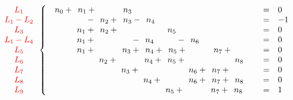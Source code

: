 \documentclass[10pt,a2paper]{article}
\begin{document}
\vspace{3em}
${\color{red}\begin{array}{c} L_1\\ L_1-L_2\\ L_3\\ L_1-L_4\\ L_5\\ L_6\\ L_7\\L_8\\L_9\end{array}    }
\left\{\begin{array}{l c l}\phantom{0}n_{0} +\phantom{0}n_{1} +\phantom{ 0n_{2} +\ } \phantom{0}n_{3} \phantom{+\ 0n_{4} +\ } \phantom{ 0n_{5} +\ } \phantom{ 0n_{6} +\ } \phantom{ 0n_{7} +\ } \phantom{ 0n_{8} +\ }&=& 0\\\phantom{0n_{0} +\ }\phantom{0n_{1} }-\phantom{0}n_{2} +\phantom{ 0}n_{3} - \phantom{0}n_{4} \phantom{+\ 0n_{5} +\ } \phantom{ 0n_{6} +\ } \phantom{ 0n_{7} +\ } \phantom{ 0n_{8} +\ }&=& -1\\\phantom{ 0n_{0} +\ } \phantom{0}n_{1} +\phantom{0}n_{2} +\phantom{ 0n_{3} +\ } \phantom{ 0n_{4} +\ } \phantom{0}n_{5} \phantom{+\ 0n_{6} +\ } \phantom{ 0n_{7} +\ } \phantom{ 0n_{8} +\ }&=& 0\\\phantom{0n_{0} +\ }\phantom{ 0}n_{1} +  \phantom{ 0n_{2} +\ } \phantom{0n_{3}  }- \phantom{0}n_{4} \phantom{+\ 0n_{5}  }- \phantom{0}n_{6} \phantom{+\ 0n_{7} +\ } \phantom{ 0n_{8} +\ }&=& 0\\\phantom{ 0n_{0} +\ } \phantom{0}n_{1} +\phantom{ 0n_{2} +\ } \phantom{0}n_{3} +\phantom{0}n_{4} +\phantom{0}n_{5} +\phantom{ 0n_{6} +\ } \phantom{0}n_{7} +\phantom{ 0n_{8} +\ }&=& 0\\\phantom{ 0n_{0} +\ } \phantom{ 0n_{1} +\ } \phantom{0}n_{2} +\phantom{ 0n_{3} +\ } \phantom{0}n_{4} +\phantom{0}n_{5} +\phantom{ 0n_{6} +\ } \phantom{ 0n_{7} +\ } \phantom{0}n_{8} &=& 0\\\phantom{ 0n_{0} +\ } \phantom{ 0n_{1} +\ } \phantom{ 0n_{2} +\ } \phantom{0}n_{3} +\phantom{ 0n_{4} +\ } \phantom{ 0n_{5} +\ } \phantom{0}n_{6} +\phantom{0}n_{7} +\phantom{ 0n_{8} +\ }&=& 0\\\phantom{ 0n_{0} +\ } \phantom{ 0n_{1} +\ } \phantom{ 0n_{2} +\ } \phantom{ 0n_{3} +\ } \phantom{0}n_{4} +\phantom{ 0n_{5} +\ } \phantom{0}n_{6} +\phantom{0}n_{7} +\phantom{0}n_{8} &=& 0\\\phantom{ 0n_{0} +\ } \phantom{ 0n_{1} +\ } \phantom{ 0n_{2} +\ } \phantom{ 0n_{3} +\ } \phantom{ 0n_{4} +\ } \phantom{0}n_{5} +\phantom{ 0n_{6} +\ } \phantom{0}n_{7} +\phantom{0}n_{8} &=& 1\\\end{array}\right.$
\end{document}
